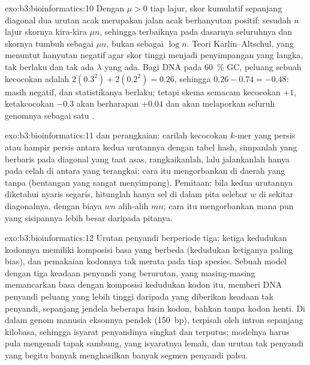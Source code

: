 \begin{solution}{exo:b3:bioinformatics:10}
Dengan  $\mu > 0$ tiap lajur, skor kumulatif
sepanjang diagonal dua urutan acak merupakan jalan acak berhanyutan
positif: sesudah $n$ lajur skornya kira-kira $\mu n$, sehingga  terbaiknya pada dasarnya seluruhnya dan skornya tumbuh sebagai
$\mu n$, bukan sebagai $\log n$. Teori Karlin--Altschul, yang
menuntut hanyutan negatif agar skor tinggi menjadi penyimpangan yang langka,
tak berlaku dan tak ada $\lambda$ yang ada. Bagi DNA pada \qty{60}{\%} GC,
peluang sebuah kecocokan adalah $2(0.3^{2}) + 2(0.2^{2}) = 0.26$, sehingga
 $0.26 - 0.74 = -0.48$: masih negatif, dan statistikanya
berlaku; tetapi skema semacam kecocokan $+1$, ketakcocokan $-0.3$ akan
berharapan $+0.04$ dan akan melaporkan seluruh genomnya sebagai satu .
\end{solution}

\begin{solution}{exo:b3:bioinformatics:11}
 dan perangkaian: carilah kecocokan $k$-mer yang persis atau hampir
persis antara kedua urutannya dengan tabel hash, simpanlah yang berbaris pada
diagonal yang taat asas, rangkaikanlah, lalu jalankanlah 
hanya pada celah di antara  yang terangkai; cara itu mengorbankan
 di daerah yang tanpa  (bentangan yang sangat menyimpang).
Pemitaan: bila kedua urutannya diketahui nyaris segaris, hitunglah hanya sel
di dalam pita selebar $w$ di sekitar diagonalnya, dengan biaya $wn$ alih-alih
$mn$; cara itu mengorbankan  mana pun yang sisipannya lebih besar
daripada pitanya.
\end{solution}

\begin{solution}{exo:b3:bioinformatics:12}
Urutan penyandi berperiode tiga: ketiga kedudukan kodonnya memiliki
komposisi basa yang berbeda (kedudukan ketiganya paling bias), dan pemakaian
kodonnya tak merata pada tiap spesies. Sebuah model dengan tiga keadaan
penyandi yang berurutan, yang masing-masing memancarkan basa dengan komposisi
kedudukan kodon itu, memberi DNA penyandi peluang yang lebih tinggi daripada
yang diberikan keadaan tak penyandi, sepanjang jendela beberapa lusin kodon,
bahkan tanpa kodon henti. Di dalam genom manusia eksonnya pendek
(\qty{150}{bp}), terpisah oleh intron sepanjang kilobasa, sehingga isyarat
penyandinya singkat dan terputus; modelnya harus pula mengenali tapak sambung,
yang isyaratnya lemah, dan urutan tak penyandi yang begitu banyak menghasilkan
banyak segmen penyandi palsu.
\end{solution}

